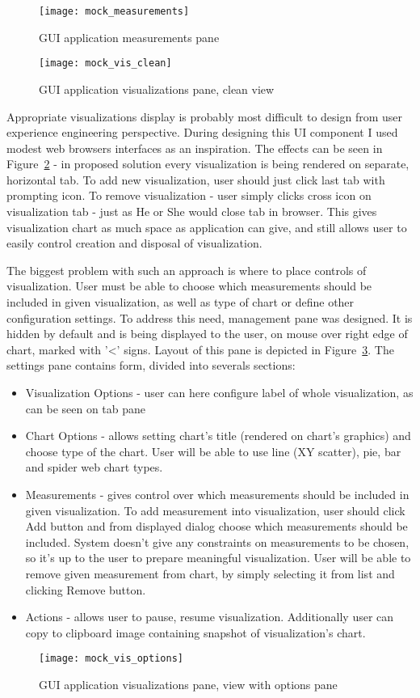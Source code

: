 \begin{figure}[ht]
  \centering
  \texttt{[image: mock\_measurements]}
  \caption{GUI application measurements pane}
  \label{fig:mock_measurements}
\end{figure}



\begin{figure}[ht]
  \centering
  \texttt{[image: mock\_vis\_clean]}
  \caption{GUI application visualizations pane, clean view}
  \label{fig:mock_vis_clean}
\end{figure}

Appropriate visualizations display is probably most difficult to design from user experience engineering perspective. During designing this UI component I used modest web browsers interfaces as an inspiration. The effects can be seen in Figure~\ref{fig:mock_vis_clean} - in proposed solution every visualization is being rendered on separate, horizontal tab. To add new visualization, user should just click last tab with prompting icon. To remove visualization - user simply clicks cross icon on visualization tab - just as He or She would close tab in browser. This gives visualization chart as much space as
application can give, and still allows user to easily control creation and disposal of visualization.

The biggest problem with such an approach is where to place controls of visualization. User must be able to choose which
measurements should be included in given visualization, as well as type of chart or define other configuration settings. To address this need, management pane was designed. It is hidden by default and is being displayed to the user, on mouse over right edge of chart, marked with '<' signs. Layout of this pane is depicted in Figure~\ref{fig:mock_vis_options}. The
settings pane contains form, divided into severals sections:

\begin{itemize}
 \item Visualization Options - user can here configure label of whole visualization, as can be seen on tab pane
 \item Chart Options - allows setting chart's title (rendered on chart's graphics) and choose type of the chart. User will
be able to use line (XY scatter), pie, bar and spider web chart types.
 \item Measurements - gives control over which measurements should be included in given visualization. To add
measurement into visualization, user should click Add button and from displayed dialog choose which measurements should
be included. System doesn't give any constraints on measurements to be chosen, so it's up to the user to prepare
meaningful visualization. User will be able to remove given measurement from chart, by simply selecting it from list
and clicking Remove button.
 \item Actions - allows user to pause, resume visualization. Additionally user can copy to clipboard image containing
snapshot of visualization's chart.
\end{itemize}


\begin{figure}[ht]
  \centering
  \texttt{[image: mock\_vis\_options]}
  \caption{GUI application visualizations pane, view with options pane}
  \label{fig:mock_vis_options}
\end{figure}


